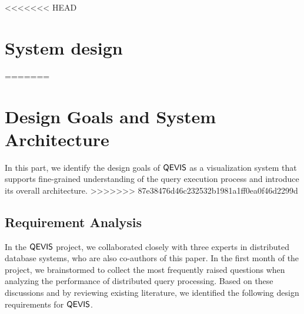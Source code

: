 <<<<<<< HEAD
\section{System design}\label{sec:systemdesign}
=======
\section{Design Goals and System Architecture}\label{sec:systemdesign}

In this part, we identify the design goals of $\mathsf{QEVIS}$ as a visualization system that supports fine-grained understanding of the query execution process and introduce its overall architecture.   
>>>>>>> 87e38476d46c232532b1981a1ff0ea0f46d2299d


\subsection{Requirement Analysis}
%

In the $\mathsf{QEVIS}$ project, we collaborated closely with three experts in distributed database systems, who are also co-authors of this paper. In the first month of the project, we brainstormed to collect the most frequently raised questions when analyzing the performance of distributed query processing. Based on these discussions and by reviewing existing literature, we identified the following design requirements for $\mathsf{QEVIS}$.


